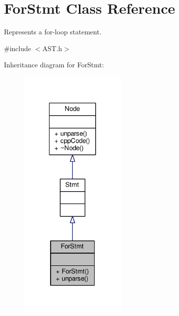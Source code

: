 \hypertarget{classForStmt}{\section{For\-Stmt Class Reference}
\label{classForStmt}
}


Represents a for-\/loop statement. \par
  




{\ttfamily \#include $<$A\-S\-T.\-h$>$}



Inheritance diagram for For\-Stmt\-:\nopagebreak
\begin{figure}[H]
\begin{center}
\leavevmode
\includegraphics[width=150pt]{classForStmt__inherit__graph}
\end{center}
\end{figure}


